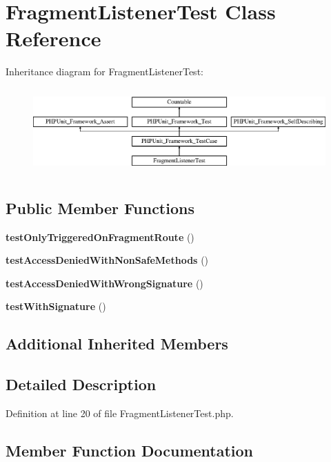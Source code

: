 \section{Fragment\+Listener\+Test Class Reference}
\label{class_symfony_1_1_component_1_1_http_kernel_1_1_tests_1_1_event_listener_1_1_fragment_listener_test}
Inheritance diagram for Fragment\+Listener\+Test\+:\begin{figure}[H]
\begin{center}
\leavevmode
\includegraphics[height=3.303835cm]{class_symfony_1_1_component_1_1_http_kernel_1_1_tests_1_1_event_listener_1_1_fragment_listener_test}
\end{center}
\end{figure}
\subsection*{Public Member Functions}
\begin{DoxyCompactItemize}
\item 
{\bf test\+Only\+Triggered\+On\+Fragment\+Route} ()
\item 
{\bf test\+Access\+Denied\+With\+Non\+Safe\+Methods} ()
\item 
{\bf test\+Access\+Denied\+With\+Wrong\+Signature} ()
\item 
{\bf test\+With\+Signature} ()
\end{DoxyCompactItemize}
\subsection*{Additional Inherited Members}


\subsection{Detailed Description}


Definition at line 20 of file Fragment\+Listener\+Test.\+php.



\subsection{Member Function Documentation}
